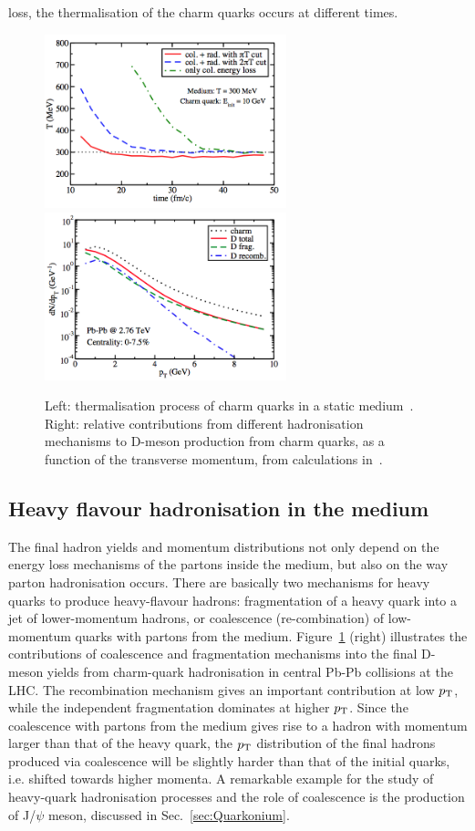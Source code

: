 loss, the thermalisation of the charm quarks occurs at different times.\\
\begin{figure}[!ht]
  \centering
  \includegraphics[width=7cm]{FigCap2/HFEnLoss3.png}
  \includegraphics[width=7cm]{FigCap2/FragHQ.png}
  \caption{Left: thermalisation process of charm quarks in a static medium~\cite{Cao:2013ita}. Right: relative contributions from different hadronisation mechanisms to D-meson production  from charm quarks, as a function of the transverse momentum, from calculations in~\cite{Cao:2013ita}.}
  \label{fig:HFEnLoss2}
\end{figure}

\subsection{Heavy flavour hadronisation in the medium}
\label{sec:HFhadro}

The final hadron yields and momentum distributions not only depend on the energy loss 
mechanisms of the partons inside the medium,
but also on the way parton hadronisation occurs. There are basically 
two mechanisms for heavy quarks 
to produce heavy-flavour hadrons: fragmentation of a 
heavy quark into a jet of lower-momentum
hadrons, or coalescence (re-combination) of low-momentum 
quarks with partons from the 
medium. Figure~\ref{fig:HFEnLoss2} (right) illustrates the 
contributions of coalescence and fragmentation 
mechanisms into the final D-meson yields from charm-quark 
hadronisation in central Pb-Pb collisions at the LHC. The recombination mechanism
gives an important contribution at low $p_{\rm T}$, while the independent 
fragmentation dominates at higher $p_{\rm T}$.
Since the coalescence with partons from the medium gives rise to a 
hadron with momentum larger than that of the 
heavy quark, the $p_{\rm T}$ distribution of the final hadrons produced via coalescence will be slightly 
harder than that of the initial quarks,
i.e. shifted towards higher momenta. A remarkable example
for the study of heavy-quark hadronisation processes and the role of coalescence is the production of J/$\psi$ meson,
discussed in Sec.~\ref{sec:Quarkonium}.\\



